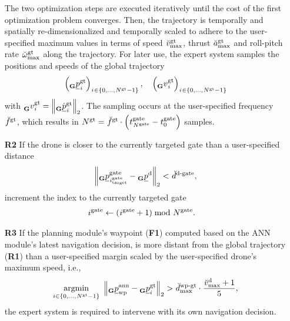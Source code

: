 \begin{itemize}
    
    
    The two optimization steps are executed iteratively until the cost
    of the first optimization problem converges. 
    Then, the trajectory is temporally and spatially re-dimensionalized
    and temporally scaled to adhere to 
    the user-specified maximum values in terms of 
    speed
    $\speed[\user]{\glotraj}{\mxm}{}{}$, 
    thrust 
    $\scacc[\user]{\glotraj}{\mxm}{}{}$
    and roll-pitch rate 
    $\scangvel[\user]{\glotraj}{\mxm}{}{}$
    along the trajectory. 
    For later use,
    the expert system samples the positions and speeds
    of the global trajectory
    \begin{equation}
        \left( 
            \pos[]{\glotraj}{\idx[]{}{}{}{}}{\grs}{}
        \right)
        _{\idx[]{}{}{}{} \in \left\{0, ..., \num[]{\glotraj}{}{}{} - 1 \right\}}
        ,\quad
        \left( 
            \speed[]{\glotraj}{\idx[]{}{}{}{}}{\grs}{}
        \right)
        _{\idx[]{}{}{}{} \in \left\{0, ..., \num[]{\glotraj}{}{}{} - 1 \right\}}
    \end{equation}
    with $\speed[]{\glotraj}{\idx[]{}{}{}{}}{\grs}{} = 
    \left\| 
        \pos[\dot]{\glotraj}{\idx[]{}{}{}{}}{\grs}{}
    \right\|_2 $.
    The sampling occurs at the
    user-specified frequency
    $\freq[\user]{\glotraj}{}{}{}$,
    which results in
    $\num[]{\glotraj}{}{}{} = \freq[\user]{\glotraj}{}{}{} \cdot 
    \left(\timepnt[]{\gate}{\num[]{\gate}{}{}{}}{}{}
    - \timepnt[]{\gate}{0}{}{}\right)$
    samples.

    
    \item [\textbf{R2}] If the drone is closer to the currently targeted gate 
    than a user-specified distance
    \begin{equation}
        \left\| 
            \pos[]{\gate}{\idx[]{\gate}{\target}{}{}}{\grs}{} - \pos[]{\drone}{}{\grs}{}
        \right\|_2 
        < 
        \dist[\user]{\dronetogate}{}{}{},
    \end{equation}
    increment the index to the currently targeted gate
    \begin{align}
        \idx[]{\gate}{}{}{} &\leftarrow (\idx[]{\gate}{}{}{} + 1) \bmod \num[]{\gate}{}{}{}.
    \end{align}
    
    \item [\textbf{R3}] If the
    planning module's waypoint (\textbf{F1}) computed based on the
    ANN module's latest navigation decision,
    is more distant from the global trajectory (\textbf{R1}) than
    a user-specified margin scaled by
    the user-specified drone's maximum speed, i.e.,
    \begin{equation}
        \argmin{i \in \{0, ..., \num[]{\glotraj}{}{}{} - 1\}}
            \left\| 
                \pos[]{\text{ann}}{\wayp}{\grs}{}
                - 
                \pos[]{\glotraj}{i}{\grs}{}
            \right\|_2
            >
            \dist[\user]{\wayptoglotraj}{\mxm}{}{} \cdot \frac{\speed[\user]{\drone}{\mxm}{}{} +1}{5},
    \end{equation}
    the expert system is required to intervene with its own navigation decision.


\end{itemize}
